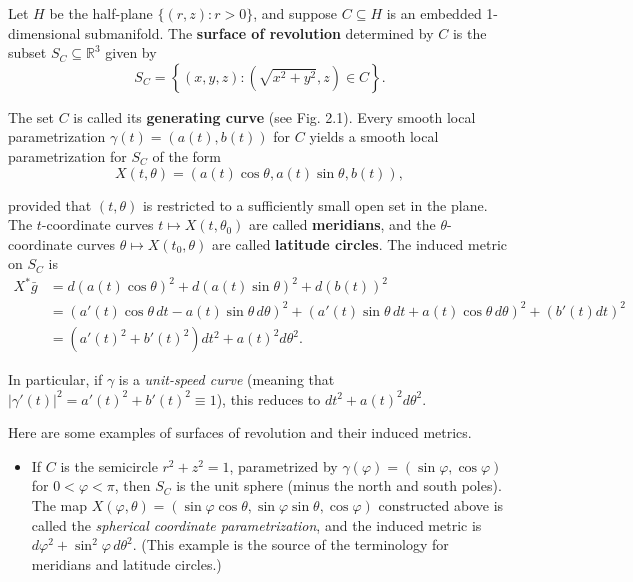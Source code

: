 \begin{example}
\label{ex:surfaces-of-revolution}

Let $H$ be the half-plane $\{(r,z) : r > 0\}$, and suppose $C \subseteq H$ is an embedded 1-dimensional submanifold. The \textbf{surface of revolution} determined by $C$ is the subset $S_C \subseteq \mathbb{R}^3$ given by
\[
S_C = \left\{(x,y,z) : \left(\sqrt{x^2 + y^2}, z\right) \in C\right\}.
\]

The set $C$ is called its \textbf{generating curve} (see Fig. 2.1). Every smooth local parametrization $\gamma(t) = (a(t), b(t))$ for $C$ yields a smooth local parametrization for $S_C$ of the form
\begin{equation}
X(t, \theta) = (a(t) \cos \theta, a(t) \sin \theta, b(t)), \tag{2.11}
\end{equation}

provided that $(t, \theta)$ is restricted to a sufficiently small open set in the plane. The $t$-coordinate curves $t \mapsto X(t, \theta_0)$ are called \textbf{meridians}, and the $\theta$-coordinate curves $\theta \mapsto X(t_0, \theta)$ are called \textbf{latitude circles}. The induced metric on $S_C$ is
\begin{align*}
X^*\bar{g} &= d(a(t)\cos\theta)^2 + d(a(t)\sin\theta)^2 + d(b(t))^2 \\
&= (a'(t)\cos\theta \, dt - a(t)\sin\theta \, d\theta)^2 + (a'(t)\sin\theta \, dt + a(t)\cos\theta \, d\theta)^2 + (b'(t)dt)^2 \\
&= (a'(t)^2 + b'(t)^2)dt^2 + a(t)^2 d\theta^2.
\end{align*}

In particular, if $\gamma$ is a \emph{unit-speed curve} (meaning that $|\gamma'(t)|^2 = a'(t)^2 + b'(t)^2 \equiv 1$), this reduces to $dt^2 + a(t)^2 d\theta^2$.

Here are some examples of surfaces of revolution and their induced metrics.

\begin{itemize}
\item If $C$ is the semicircle $r^2 + z^2 = 1$, parametrized by $\gamma(\varphi)=(\sin\varphi, \cos\varphi)$ for $0 < \varphi < \pi$, then $S_C$ is the unit sphere (minus the north and south poles). The map $X(\varphi, \theta) = (\sin\varphi\cos\theta, \sin\varphi\sin\theta, \cos\varphi)$ constructed above is called the \emph{spherical coordinate parametrization}, and the induced metric is $d\varphi^2 + \sin^2\varphi \, d\theta^2$. (This example is the source of the terminology for meridians and latitude circles.)


\end{itemize}
\end{example}

